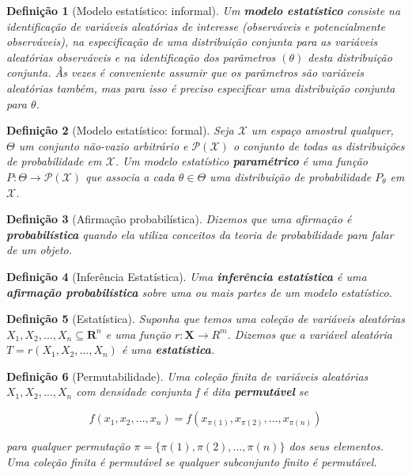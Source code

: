 \documentclass{article}
\newtheorem{definition}{Definição}
\begin{document}
	\begin{definition}[Modelo estatístico: informal]
		Um \textbf{modelo estatístico} consiste na identificação de variáveis aleatórias de interesse (observáveis e potencialmente observáveis), na especificação de uma distribuição conjunta para as variáveis aleatórias observáveis e na identificação dos parâmetros $(\theta)$ desta distribuição conjunta. Às vezes é conveniente assumir que os parâmetros são variáveis aleatórias também, mas para isso é preciso especificar uma distribuição conjunta para $\theta$.
	\end{definition}
	
	\begin{definition}[Modelo estatístico: formal]
		Seja $\mathcal{X}$ um espaço amostral qualquer, $\Theta$ um conjunto não-vazio arbitrário e $\mathcal{P(X)}$ o conjunto de todas as distribuições de probabilidade em $\mathcal{X}$. Um modelo estatístico \textbf{paramétrico} é uma função $P: \Theta \rightarrow \mathcal{P(X)}$ que associa a cada $\theta \in \Theta$ uma distribuição de probabilidade $P_\theta$ em $\mathcal{X}$.
	\end{definition}
	
	\begin{definition}[Afirmação probabilística]
		Dizemos que uma afirmação é \textbf{probabilística} quando ela utiliza conceitos da teoria de probabilidade para falar de um objeto.
	\end{definition}
	
	\begin{definition}[Inferência Estatística]
		Uma \textbf{inferência estatística} é uma \textbf{afirmação probabilística} sobre uma ou mais partes de um modelo estatístico.
	\end{definition}
	
	\begin{definition}[Estatística]
		Suponha que temos uma coleção de variáveis aleatórias $X_1, X_2, \ldots, X_n \subseteq \mathbf{R}^n$ e uma função $r: \mathbf{X} \rightarrow R^m$. Dizemos que a variável aleatória $T = r(X_1, X_2, \ldots, X_n)$ é uma \textbf{estatística}.
	\end{definition}
	
	\begin{definition}[Permutabilidade]
		Uma coleção finita de variáveis aleatórias $X_1, X_2, \ldots, X_n$ com densidade conjunta f é dita \textbf{permutável} se
		
		\begin{equation}
			f(x_1, x_2, \ldots, x_n) = f(x_{\pi(1)}, x_{\pi(2)}, \ldots, x_{\pi(n)})
		\end{equation}
		
		para qualquer permutação $\pi = \{\pi(1), \pi(2), \ldots, \pi(n)\}$ dos seus elementos. Uma coleção finita é permutável se qualquer subconjunto finito é permutável.
	\end{definition}
	
\end{document}

